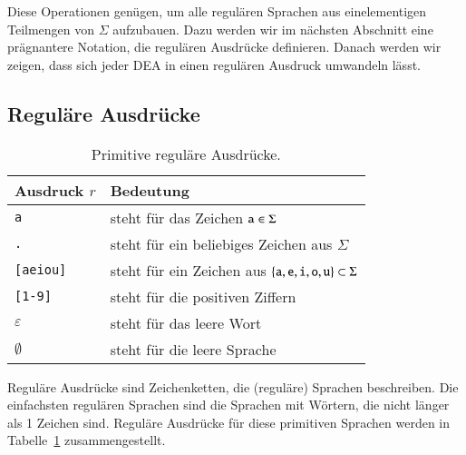 Diese Operationen genügen, um alle regulären Sprachen aus
einelementigen Teilmengen von $\Sigma$ aufzubauen.
Dazu werden wir im nächsten Abschnitt eine prägnantere Notation,
die regulären Ausdrücke definieren.
Danach werden wir zeigen,
dass sich jeder DEA in einen regulären Ausdruck umwandeln lässt.

\subsection{Reguläre Ausdrücke\label{regulaer:regulaere-ausdruecke}}
\begin{table}
\begin{center}
\begin{tabular}{|l|l|}
\hline
Ausdruck $r$&Bedeutung\\
\hline
{\tt a}&steht für das Zeichen ${\tt a}\in \Sigma$\\
{\tt .}&steht für ein beliebiges Zeichen aus $\Sigma$\\
{\tt [aeiou]}&steht für ein Zeichen aus $\{{\tt a},{\tt e},{\tt i},{\tt o},{\tt u}\}\subset \Sigma$\\
{\tt [1-9]}&steht für die positiven Ziffern\\
$\varepsilon$&steht für das leere Wort\\
$\emptyset$&steht für die leere Sprache\\
\hline
\end{tabular}
\end{center}
\caption{Primitive reguläre Ausdrücke.\label{regtab1}}
\end{table}
Reguläre Ausdrücke sind Zeichenketten, die (reguläre) Sprachen
beschreiben.
Die einfachsten regulären Sprachen sind die Sprachen mit Wörtern,
die nicht länger als 1 Zeichen sind.
Reguläre Ausdrücke für
diese primitiven Sprachen werden in Tabelle~\ref{regtab1} zusammengestellt.

